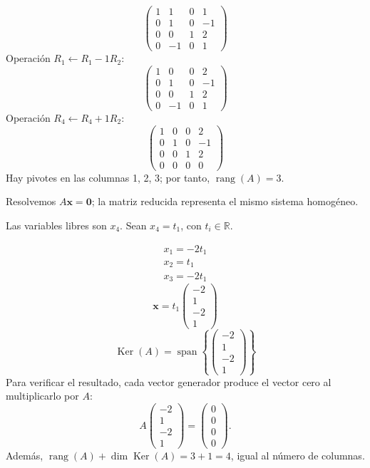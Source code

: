 \documentclass[12pt]{article}
\theoremstyle{remark}
\newcommand{\rang}{\operatorname{rang}}
\newcommand{\Ker}{\operatorname{Ker}}
\newcommand{\vect}[1]{\boldsymbol{#1}}
\begin{document}
\[
\begin{pmatrix}1&1&0&1\\0&1&0&-1\\0&0&1&2\\0&-1&0&1\end{pmatrix}
\]
Operación $R_{1}\leftarrow R_{1}-1R_{2}$:
\[
\begin{pmatrix}1&0&0&2\\0&1&0&-1\\0&0&1&2\\0&-1&0&1\end{pmatrix}
\]
Operación $R_{4}\leftarrow R_{4}+1R_{2}$:
\[
\begin{pmatrix}1&0&0&2\\0&1&0&-1\\0&0&1&2\\0&0&0&0\end{pmatrix}
\]
Hay pivotes en las columnas 1, 2, 3; por tanto, $\boxed{\rang(A)=3}$.

Resolvemos $A\vect x=\vect0$; la matriz reducida representa el mismo sistema homogéneo.

Las variables libres son $x_{4}$. Sean $x_{4}=t_{1}$, con $t_i\in\mathbb R$.

\[
\begin{aligned}x_{1}=- 2 t_{1}\\x_{2}=t_{1}\\x_{3}=- 2 t_{1}\end{aligned}
\]
\[
\vect x=t_{1}\begin{pmatrix}-2\\1\\-2\\1\end{pmatrix}
\]
\[
\boxed{\Ker(A)=\operatorname{span}\left\{\begin{pmatrix}-2\\1\\-2\\1\end{pmatrix}\right\}}
\]
Para verificar el resultado, cada vector generador produce el vector cero al multiplicarlo por $A$:
\[
A\begin{pmatrix}-2\\1\\-2\\1\end{pmatrix}=\begin{pmatrix}0\\0\\0\\0\end{pmatrix}.
\]
Además, $\rang(A)+\dim\Ker(A)=3+1=4$, igual al número de columnas.
\end{document}
